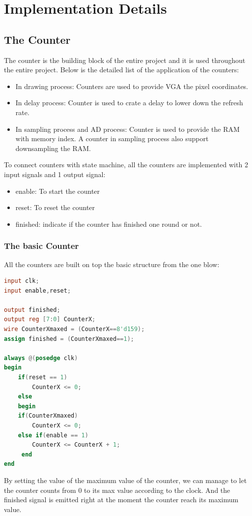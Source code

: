 \documentclass[11pt]{scrartcl}
\begin{document}
\section{Implementation Details}
\subsection{The Counter}
The counter is the building block of the entire project and it is used throughout the entire project. Below is the detailed list of the application of the counters:
\begin{itemize}
    \item In drawing process:
     Counters are used to provide VGA the pixel coordinates.
     \item In delay process:
     Counter is used to crate a delay to lower down the refresh rate.
     \item In sampling process and AD process:
    Counter is used to provide the RAM with memory index. A counter in sampling process also support downsampling the RAM.
\end{itemize}

To connect counters with state machine, all the counters are implemented with 2 input signals and 1 output signal:
\begin{itemize}
    \item enable: To start the counter
    \item reset: To reset the counter
    \item finished: indicate if the counter has finished one round or not.
\end{itemize}
\subsubsection{The basic Counter}
\label{sec:bascount}
All the counters are built on top the basic structure from the one blow:

\begin{lstlisting}[language=Verilog]
input clk;
input enable,reset;

output finished;
output reg [7:0] CounterX;
wire CounterXmaxed = (CounterX==8'd159); 
assign finished = (CounterXmaxed==1);

always @(posedge clk)
begin
	if(reset == 1)
		CounterX <= 0;
	else
	begin
	if(CounterXmaxed)
	  	CounterX <= 0;
	else if(enable == 1)
	  	CounterX <= CounterX + 1;
	 end
end
\end{lstlisting}

By setting the value of the maximum value of the counter, we can manage to let the counter counts from 0 to its max value according to the clock. And the finished signal is emitted right at the moment the counter reach its maximum value.
\end{document}
